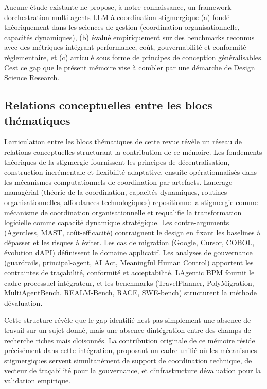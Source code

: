 \documentclass[12pt,a4paper]{article}
\begin{document}
Aucune étude existante ne propose, à notre connaissance, un framework
d\textquotesingle orchestration multi-agents LLM à coordination
stigmergique (a) fondé théoriquement dans les sciences de gestion
(coordination organisationnelle, capacités dynamiques), (b) évalué
empiriquement sur des benchmarks reconnus avec des métriques intégrant
performance, coût, gouvernabilité et conformité réglementaire, et
(c) articulé sous forme de principes de conception
généralisables. C\textquotesingle est ce gap que le présent
mémoire vise à combler par une démarche de Design Science Research.

\subsection{Relations conceptuelles entre les blocs
thématiques}\label{relations-conceptuelles-entre-les-blocs-thuxe9matiques}

L\textquotesingle articulation entre les blocs thématiques de cette
revue révèle un réseau de relations conceptuelles structurant la
contribution de ce mémoire. Les fondements théoriques de la stigmergie
fournissent les principes de décentralisation, construction incrémentale
et flexibilité adaptative, ensuite opérationnalisés dans les mécanismes
computationnels de coordination par artefacts. L\textquotesingle ancrage
managérial (théorie de la coordination, capacités dynamiques, routines
organisationnelles, affordances technologiques) repositionne la
stigmergie comme mécanisme de coordination organisationnelle et requalifie
la transformation logicielle comme capacité dynamique stratégique.
Les contre-arguments
(Agentless, MAST, coût-efficacité) contraignent le design en fixant les
baselines à dépasser et les risques à éviter. Les cas de migration
(Google, Cursor, COBOL, évolution d\textquotesingle API) définissent le
domaine applicatif. Les analyses de gouvernance (guardrails,
principal-agent, AI Act, Meaningful Human Control) apportent les
contraintes de traçabilité, conformité et acceptabilité.
L\textquotesingle Agentic BPM fournit le cadre processuel intégrateur,
et les benchmarks (TravelPlanner, PolyMigration, MultiAgentBench,
REALM-Bench, RACE, SWE-bench) structurent la méthode
d\textquotesingle évaluation.

Cette structure révèle que le gap identifié n\textquotesingle est pas
simplement une absence de travail sur un sujet donné, mais une absence
d\textquotesingle intégration entre des champs de recherche riches mais
cloisonnés. La contribution originale de ce mémoire réside précisément
dans cette intégration, proposant un cadre unifié où les mécanismes
stigmergiques servent simultanément de support de coordination
technique, de vecteur de traçabilité pour la gouvernance, et
d\textquotesingle infrastructure d\textquotesingle évaluation pour la
validation empirique.
\end{document}
